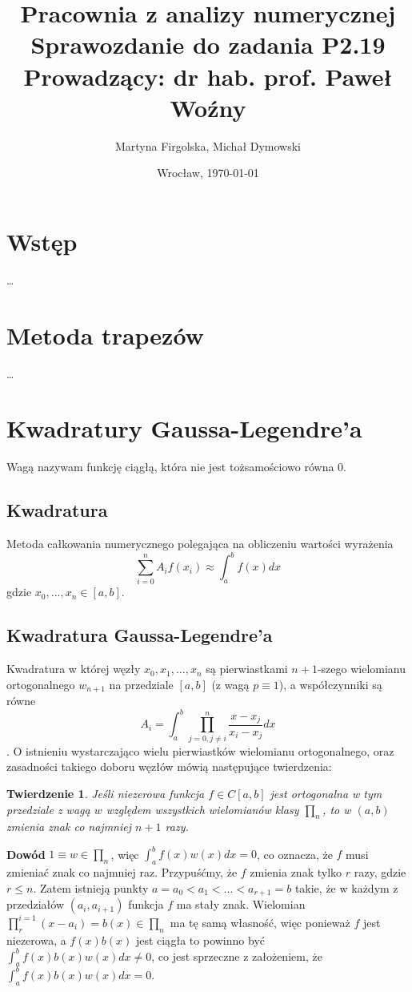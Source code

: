 \documentclass{article}
\title{
	\textbf{Pracownia z analizy numerycznej}\\[8pt]
	\large{Sprawozdanie do zadania \textbf{P2.19}\\
	Prowadzący: dr hab. prof. Paweł Woźny}}
\author{\large{Martyna Firgolska, Michał Dymowski}}
\date{\large{Wrocław, \today}}
\newtheorem{theorem}{Twierdzenie}
\begin{document}
\maketitle 

\section*{Wstęp}
\dots
\section*{Metoda trapezów}
\dots
\section*{Kwadratury Gaussa-Legendre'a}
	Wagą nazywam funkcję ciągłą, która nie jest tożsamościowo równa 0.
\subsection*{Kwadratura} 
Metoda całkowania numerycznego polegająca na obliczeniu wartości wyrażenia
\[ \sum_{i=0}^n A_if(x_i) \approx \int_a^b f(x) d x \] 
gdzie $x_0,...,x_n\in [a,b]$.

\subsection*{Kwadratura Gaussa-Legendre'a}
Kwadratura w której węzły $x_0,x_1,...,x_n$ są pierwiastkami $n+1$-szego
wielomianu ortogonalnego $w_{n+1}$ na przedziale $[a,b]$ (z wagą $p\equiv 1$), a współczynniki są równe
\[A_i=\int_a^b \prod_{j=0,j\neq i}^n \frac{x-x_j}{x_i-x_j} dx\]. O istnieniu
wystarczająco wielu pierwiastków wielomianu ortogonalnego, oraz zasadności 
takiego doboru węzłów mówią następujące twierdzenia: 
\begin{theorem}
	Jeśli niezerowa funkcja $f\in C[a,b]$ jest ortogonalna w tym przedziale z wagą $w$ względem wszystkich wielomianów klasy $\prod_{n}$, to w $(a,b)$ zmienia znak co najmniej $n+1$ razy.
\end{theorem}
\textbf{Dowód} $1\equiv w \in \prod_{n}$, więc $\int_a^b f(x)w(x)dx = 0$, co oznacza, że $f$ musi zmieniać znak co najmniej raz. Przypuśćmy, że $f$ zmienia znak tylko $r$ razy, gdzie $r\le n $. Zatem istnieją punkty $a=a_0<a_1<...<a_{r+1}=b$ takie, że w każdym z przedziałów $(a_i,a_{i+1})$ funkcja $f$ ma stały znak. Wielomian $\prod_{r}^{i=1}(x-a_i) = b(x) \in \prod_{n}$ ma tę samą własność, więc ponieważ $f$ jest niezerowa, a $f(x)b(x)$ jest ciągła to powinno być $\int_{a}^{b} f(x)b(x)w(x)dx\neq 0$, co jest sprzeczne z założeniem, że $\int_{a}^{b}f(x)b(x)w(x)dx = 0$. \newline
\end{document}
